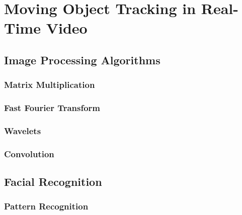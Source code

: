 \chapter{Moving Object Tracking in Real-Time Video}

\section{Image Processing Algorithms}

\subsection{Matrix Multiplication}
\subsection{Fast Fourier Transform}
\subsection{Wavelets}
\subsection{Convolution}

\section{Facial Recognition}
\subsection{Pattern Recognition}

